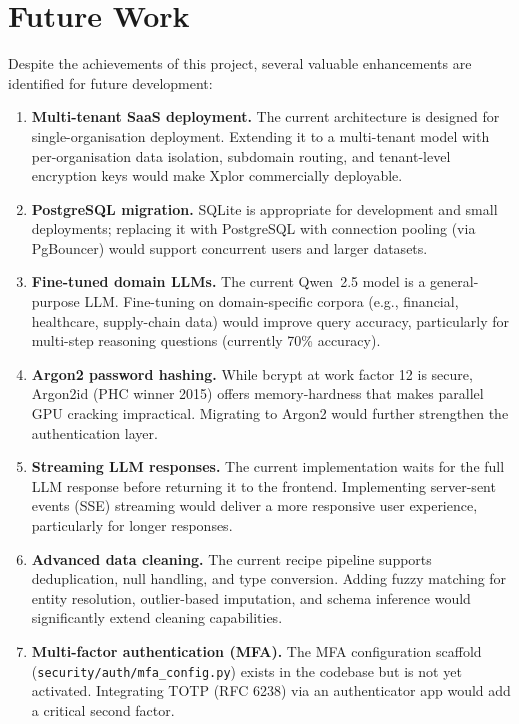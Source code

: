 \documentclass[12pt,a4paper]{report}
\begin{document}
\chapter{Future Work}

Despite the achievements of this project, several valuable enhancements are identified for future development:

\begin{enumerate}[leftmargin=2em]

    \item \textbf{Multi-tenant SaaS deployment.} The current architecture is designed for single-organisation deployment. Extending it to a multi-tenant model with per-organisation data isolation, subdomain routing, and tenant-level encryption keys would make Xplor commercially deployable.

    \item \textbf{PostgreSQL migration.} SQLite is appropriate for development and small deployments; replacing it with PostgreSQL with connection pooling (via PgBouncer) would support concurrent users and larger datasets.

    \item \textbf{Fine-tuned domain LLMs.} The current Qwen~2.5 model is a general-purpose LLM. Fine-tuning on domain-specific corpora (e.g., financial, healthcare, supply-chain data) would improve query accuracy, particularly for multi-step reasoning questions (currently 70\% accuracy).

    \item \textbf{Argon2 password hashing.} While bcrypt at work factor 12 is secure, Argon2id (PHC winner 2015) offers memory-hardness that makes parallel GPU cracking impractical. Migrating to Argon2 would further strengthen the authentication layer.

    \item \textbf{Streaming LLM responses.} The current implementation waits for the full LLM response before returning it to the frontend. Implementing server-sent events (SSE) streaming would deliver a more responsive user experience, particularly for longer responses.

    \item \textbf{Advanced data cleaning.} The current recipe pipeline supports deduplication, null handling, and type conversion. Adding fuzzy matching for entity resolution, outlier-based imputation, and schema inference would significantly extend cleaning capabilities.

    \item \textbf{Multi-factor authentication (MFA).} The MFA configuration scaffold (\texttt{security/auth/mfa\_config.py}) exists in the codebase but is not yet activated. Integrating TOTP (RFC 6238) via an authenticator app would add a critical second factor.


\end{enumerate}
\end{document}
